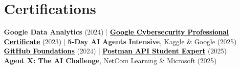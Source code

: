 \documentclass[a4paper]{article}
\begin{document}
\section{Certifications}
\begin{itemize}[leftmargin=0.15in, label={}]
\small{\item{
\textbf{Google Data Analytics} (2024) \;|\;
\href{https://coursera.org/share/44fd8f381cb39ac45892569cdf6f7674}{\textcolor{black}{\textbf{Google Cybersecurity Professional Certificate}}} (2023) \;|\;
\textbf{5-Day AI Agents Intensive}, Kaggle \& Google (2025)\\
\href{https://www.credly.com/badges/d5c30c19-02db-4c5f-9bc9-4bd0f4b6a89e/public_url}{\textcolor{black}{\textbf{GitHub Foundations}}} (2024) \;|\;
\href{https://badges.parchment.com/public/assertions/ZF0yx-i3T1CvXYwDLEUneA?identity__email=sakib.sadman.badhon\%40g.bracu.ac.bd}{\textcolor{black}{\textbf{Postman API Student Expert}}} (2025) \;|\;
\textbf{Agent X: The AI Challenge}, NetCom Learning \& Microsoft (2025)
}}
\end{itemize}

\end{document}
